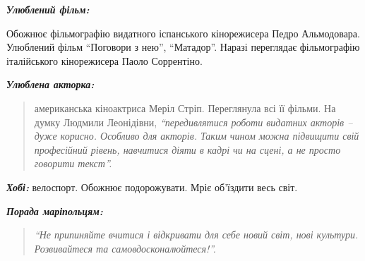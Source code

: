 
\emph{\textbf{Улюблений фільм:}}

Обожнює фільмографію видатного іспанського кінорежисера Педро Альмодовара.
Улюблений фільм \enquote{Поговори з нею}, \enquote{Матадор}. Наразі переглядає фільмографію
італійського кінорежисера Паоло Соррентіно.

\emph{\textbf{Улюблена акторка:}}

\begin{quote}
американська кіноактриса Меріл Стріп. Переглянула всі її фільми. На думку
Людмили Леонідівни, \emph{\enquote{передивлятися роботи видатних акторів – дуже
корисно. Особливо для акторів. Таким чином можна підвищити свій
професійний рівень, навчитися діяти в кадрі чи на сцені, а не просто
говорити текст}.}
\end{quote}

\emph{\textbf{Хобі:}} велоспорт. Обожнює подорожувати. Мріє об'їздити весь світ.

\emph{\textbf{Порада маріпольцям:}}

\begin{quote}
\em\enquote{Не припиняйте вчитися і відкривати для себе новий світ, нові культури.
Розвивайтеся та самовдосконалюйтеся!}.
\end{quote}
